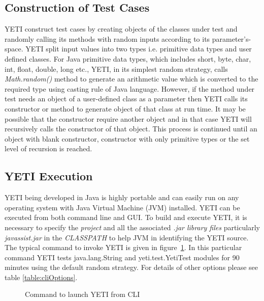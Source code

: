 \subsection{Construction of Test Cases}
YETI construct test cases by creating objects of the classes under test and randomly calling its methods with random inputs according to its parameter's-space. YETI split input values into two types i.e. primitive data types and user defined classes. For Java primitive data types, which includes short, byte, char, int, float, double, long etc., YETI, in its simplest random strategy, calls {\it Math.random()} method to generate an arithmetic value which is converted to the required type using casting rule of Java language. However, if the method under test needs an object of a user-defined class as a parameter then YETI calls its constructor or method to generate object of that class at run time. It may be possible that the constructor require another object and in that case YETI will recursively calls the constructor of that object. This process is continued until an object with blank constructor, constructor with only primitive types or the set level of recursion is reached.


\subsection{YETI Execution}
YETI being developed in Java is highly portable and can easily run on any operating system with Java Virtual Machine (JVM) installed. YETI can be executed from both command line and GUI. To build and execute YETI, it is necessary to specify the {\it project} and all the associated {\it .jar library files} particularly {\it javassist.jar} in the {\it CLASSPATH} to help JVM in identifying the YETI source. The typical command to invoke YETI is given in figure~\ref{fig:yeticommand}. In this particular command YETI tests java.lang.String and yeti.test.YetiTest modules for 90 minutes using the default random strategy. For details of other options please see table \ref{table:cliOptions}. 

\begin{figure}[h]
	\centering
	\caption{Command to launch YETI from CLI}
	\label{fig:yeticommand}
\end{figure}

